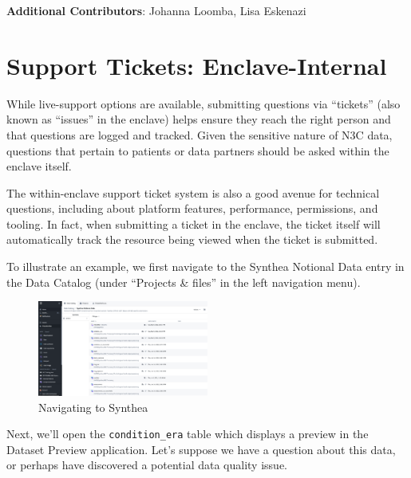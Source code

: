 \documentclass[
  letterpaper,
  DIV=11,
  numbers=noendperiod]{scrreprt}
\begin{document}
\hfill\break

\textbf{Additional Contributors}: Johanna Loomba, Lisa Eskenazi

\hypertarget{sec-support-internal}{%
\section{Support Tickets: Enclave-Internal}\label{sec-support-internal}}

While live-support options are available, submitting questions via
``tickets'' (also known as ``issues'' in the enclave) helps ensure they
reach the right person and that questions are logged and tracked. Given
the sensitive nature of N3C data, questions that pertain to patients or
data partners should be asked within the enclave itself.

The within-enclave support ticket system is also a good avenue for
technical questions, including about platform features, performance,
permissions, and tooling. In fact, when submitting a ticket in the
enclave, the ticket itself will automatically track the resource being
viewed when the ticket is submitted.

To illustrate an example, we first navigate to the Synthea Notional Data
entry in the Data Catalog (under ``Projects \& files'' in the left
navigation menu).

\begin{figure}

{\centering \includegraphics[width=0.5\textwidth,height=\textheight]{chapters/images/support/image-01-synthea-folder.png}

}

\caption{\label{fig-support-synthea-folder}Navigating to Synthea}

\end{figure}

Next, we'll open the \texttt{condition\_era} table which displays a
preview in the Dataset Preview application. Let's suppose we have a
question about this data, or perhaps have discovered a potential data
quality issue.
\end{document}
